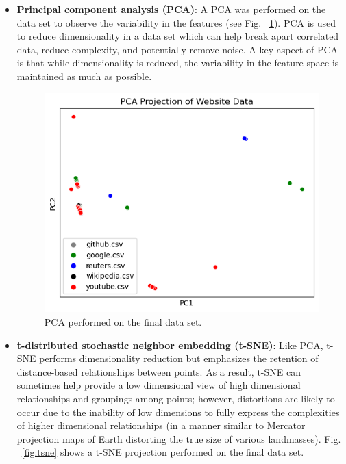 \documentclass[10pt,sigconf,letterpaper,nonacm]{acmart}
\begin{document}
\begin{itemize}
  \item \textbf{Principal component analysis (PCA)}: A PCA was performed on the data set to observe the variability in the features (see Fig. ~\ref{fig:pca}).
  PCA is used to reduce dimensionality in a data set which can help break apart correlated data, reduce complexity, and potentially remove noise.
  A key aspect of PCA is that while dimensionality is reduced, the variability in the feature space is maintained as much as possible.
  
  \begin{figure}[t]
    \centering
    \includegraphics[width=\linewidth]{img/pca.png}
    \caption{PCA performed on the final data set.}
    \label{fig:pca}
  \end{figure}

  \item \textbf{t-distributed stochastic neighbor embedding (t-SNE)}: Like PCA, t-SNE performs dimensionality reduction but emphasizes the retention of distance-based relationships between points.
  As a result, t-SNE can sometimes help provide a low dimensional view of high dimensional relationships and groupings among points; however, distortions are likely to occur due to the inability of low dimensions to fully express the complexities of higher dimensional relationships (in a manner similar to Mercator projection maps of Earth distorting the true size of various landmasses).
  Fig. ~\ref{fig:tsne} shows a t-SNE projection performed on the final data set.


\end{itemize}
\end{document}
